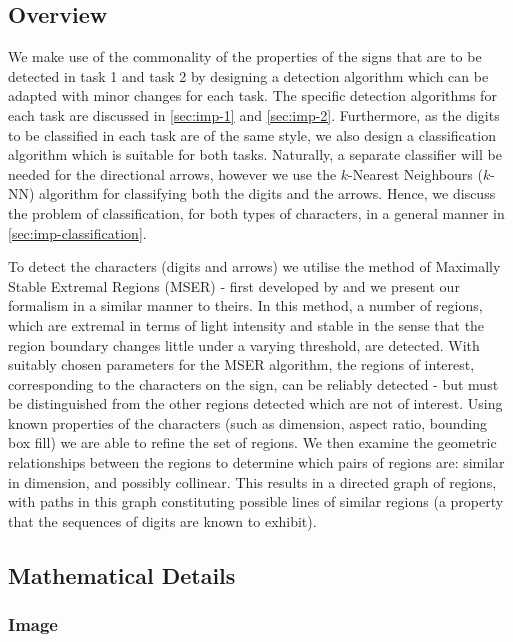 \documentclass{article}
\begin{document}
\subsection{Overview}
\label{sec:imp-overview}

We make use of the commonality of the properties of the signs that are to be
detected in task 1 and task 2 by designing a detection algorithm which can be
adapted with minor changes for each task.
The specific detection algorithms for each task are discussed in
\autoref{sec:imp-1} and \autoref{sec:imp-2}.
Furthermore, as the digits to be classified in each task are of the same style,
we also design a classification algorithm which is suitable for both tasks.
Naturally, a separate classifier will be needed for the directional arrows,
however we use the $k$-Nearest Neighbours ($k$-NN) algorithm for classifying
both the digits and the arrows.
Hence, we discuss the problem of classification, for both types of characters,
in a general manner in \autoref{sec:imp-classification}.

To detect the characters (digits and arrows) we utilise the method of
Maximally Stable Extremal Regions (MSER) - first developed by
\cite{MATAS2004761} and we present our formalism in a similar manner to theirs.
In this method, a number of regions, which are extremal in terms of light
intensity and stable in the sense that the region boundary changes little under
a varying threshold, are detected.
With suitably chosen parameters for the MSER algorithm, the regions of interest,
corresponding to the characters on the sign, can be reliably detected - but must
be distinguished from the other regions detected which are not of interest.
Using known properties of the characters (such as dimension, aspect ratio,
bounding box fill) we are able to refine the set of regions.
We then examine the geometric relationships between the regions to determine
which pairs of regions are: similar in dimension, and possibly collinear.
This results in a directed graph of regions, with paths in this graph
constituting possible lines of similar regions (a property that the sequences of
digits are known to exhibit).


\subsection{Mathematical Details}
\label{sec:mathematical-details}

\subsubsection*{Image}
\end{document}
